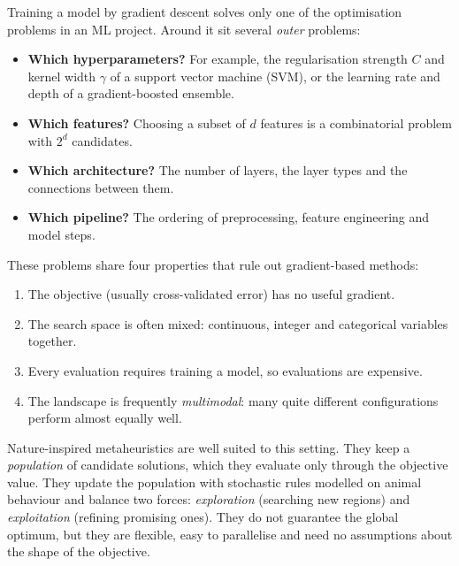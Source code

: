 \documentclass[11pt,a4paper]{article}
\begin{document}
Training a model by gradient descent solves only one of the optimisation problems in an ML project. Around it sit several \emph{outer} problems:
\begin{itemize}
  \item \textbf{Which hyperparameters?} For example, the regularisation strength $C$ and kernel width $\gamma$ of a support vector machine (SVM), or the learning rate and depth of a gradient-boosted ensemble.
  \item \textbf{Which features?} Choosing a subset of $d$ features is a combinatorial problem with $2^d$ candidates.
  \item \textbf{Which architecture?} The number of layers, the layer types and the connections between them.
  \item \textbf{Which pipeline?} The ordering of preprocessing, feature engineering and model steps.
\end{itemize}

These problems share four properties that rule out gradient-based methods:
\begin{enumerate}
  \item The objective (usually cross-validated error) has no useful gradient.
  \item The search space is often mixed: continuous, integer and categorical variables together.
  \item Every evaluation requires training a model, so evaluations are expensive.
  \item The landscape is frequently \emph{multimodal}: many quite different configurations perform almost equally well.
\end{enumerate}

Nature-inspired metaheuristics are well suited to this setting. They keep a \emph{population} of candidate solutions, which they evaluate only through the objective value. They update the population with stochastic rules modelled on animal behaviour and balance two forces: \emph{exploration} (searching new regions) and \emph{exploitation} (refining promising ones). They do not guarantee the global optimum, but they are flexible, easy to parallelise and need no assumptions about the shape of the objective.
\end{document}
